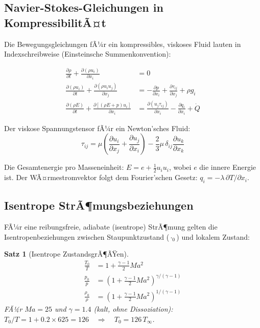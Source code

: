 ﻿\documentclass[12pt,a4paper]{article}
\newtheorem{satz}{Satz}[section]
\newcommand{\Ma}{M\!a}
\begin{document}
\subsection{Navier-Stokes-Gleichungen in KompressibilitÃ¤t}

Die Bewegungsgleichungen fÃ¼r ein kompressibles, viskoses Fluid lauten in
Indexschreibweise (Einsteinsche Summenkonvention):

\begin{align}
  \frac{\partial \rho}{\partial t} + \frac{\partial (\rho u_i)}{\partial x_i} &= 0
  \tag{KontinuitÃ¤t}\label{eq:kont}\\[4pt]
  \frac{\partial (\rho u_i)}{\partial t} + \frac{\partial (\rho u_i u_j)}{\partial x_j}
  &= -\frac{\partial p}{\partial x_i} + \frac{\partial \tau_{ij}}{\partial x_j} + \rho g_i
  \tag{Impuls}\label{eq:impuls}\\[4pt]
  \frac{\partial (\rho E)}{\partial t} + \frac{\partial [(\rho E + p)u_i]}{\partial x_i}
  &= \frac{\partial (u_j \tau_{ij})}{\partial x_i}
    - \frac{\partial q_i}{\partial x_i} + \dot{Q}
  \tag{Energie}\label{eq:energie}
\end{align}

Der viskose Spannungstensor fÃ¼r ein Newton'sches Fluid:
\[
  \tau_{ij} = \mu\left(\frac{\partial u_i}{\partial x_j}
    + \frac{\partial u_j}{\partial x_i}\right)
    - \frac{2}{3}\mu\,\delta_{ij}\frac{\partial u_k}{\partial x_k}
\]

Die Gesamtenergie pro Masseneinheit: $E = e + \frac{1}{2}u_i u_i$, wobei $e$ die
innere Energie ist. Der WÃ¤rmestromvektor folgt dem Fourier'schen Gesetz:
$q_i = -\lambda\,\partial T/\partial x_i$.

\subsection{Isentrope StrÃ¶mungsbeziehungen}

FÃ¼r eine reibungsfreie, adiabate (isentrope) StrÃ¶mung gelten die
Isentropenbeziehungen zwischen Staupunktzustand ($\cdot_0$) und lokalem Zustand:

\begin{satz}[Isentrope ZustandsgrÃ¶ÃŸen]
\begin{align}
  \frac{T_0}{T} &= 1 + \frac{\gamma-1}{2}\Ma^2
  \label{eq:T_isentrop}\\[4pt]
  \frac{p_0}{p} &= \left(1 + \frac{\gamma-1}{2}\Ma^2\right)^{\gamma/(\gamma-1)}
  \label{eq:p_isentrop}\\[4pt]
  \frac{\rho_0}{\rho} &= \left(1 + \frac{\gamma-1}{2}\Ma^2\right)^{1/(\gamma-1)}
  \label{eq:rho_isentrop}
\end{align}
FÃ¼r $\Ma = 25$ und $\gamma = 1.4$ (kalt, ohne Dissoziation):
$T_0/T = 1 + 0.2 \times 625 = 126 \quad\Rightarrow\quad T_0 = 126\,T_\infty$.
\end{satz}
\end{document}
